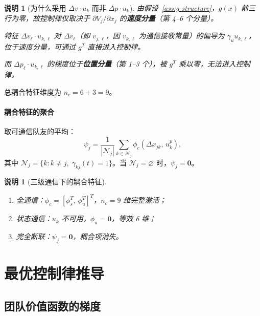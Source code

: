 \documentclass[12pt,a4paper]{ctexart}
\newtheorem{remark}[theorem]{说明}
\begin{document}
\begin{remark}[为什么采用 $\Delta v \cdot u_k$ 而非 $\Delta p \cdot u_k$]\label{rmk:why-dv-uk}
由假设~\ref{ass:g-structure}，$g(x)$ 前三行为零，故控制律仅取决于 $\partial V_j/\partial x_j$ 的\textbf{速度分量}（第 4--6 个分量）。

特征 $\Delta v_\ell \cdot u_{k,\ell}$ 对 $\Delta v_\ell$（即 $v_{j,\ell}$，因 $v_{k,\ell}$ 为通信接收常量）的偏导为 $\gamma_u u_{k,\ell}$，位于速度分量，可通过 $g^T$ 直接进入控制律。

而 $\Delta p_\ell \cdot u_{k,\ell}$ 的梯度位于\textbf{位置分量}（第 1--3 个），被 $g^T$ 乘以零，无法进入控制律。
\end{remark}

总耦合特征维度为 $n_c = 6 + 3 = 9$。

\paragraph{耦合特征的聚合}
取可通信队友的平均：
\begin{equation}\label{eq:psi-j}
\psi_j = \frac{1}{|\mathcal{N}_j|} \sum_{k \in \mathcal{N}_j} \phi_c(\Delta x_{jk},\, u_k^p),
\end{equation}
其中 $\mathcal{N}_j = \{k : k \neq j,\;\gamma_{kj}(t) = 1\}$。当 $\mathcal{N}_j = \varnothing$ 时，$\psi_j = \bm{0}$。

\begin{remark}[三级通信下的耦合特征]
\begin{enumerate}[label=(\roman*)]
\item 全通信：$\phi_c = [\phi_s^T,\, \phi_u^T]^T$，$n_c = 9$ 维完整激活；
\item 状态通信：$u_k$ 不可用，$\phi_u = \bm{0}$，等效 6 维；
\item 完全断联：$\psi_j = \bm{0}$，耦合项消失。
\end{enumerate}
\end{remark}


\section{最优控制律推导}

\subsection{团队价值函数的梯度}
\end{document}
